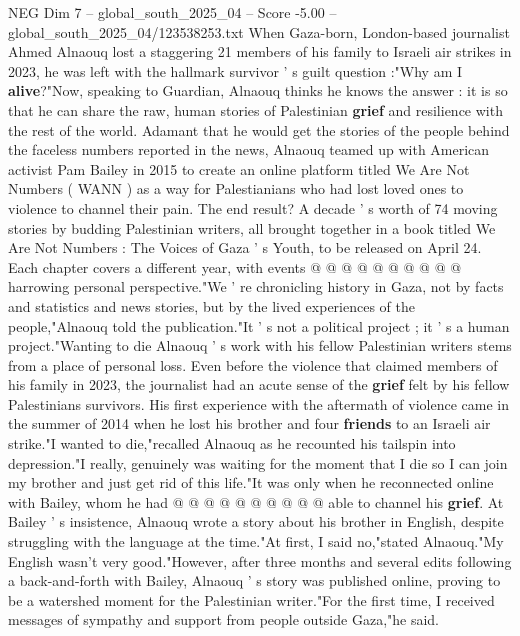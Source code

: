 \begin{textsample}{NEG Dim 7 – global\_south\_2025\_04 – Score -5.00 – global\_south\_2025\_04/123538253.txt}  \label{ex:f7_neg_309}
When Gaza-born, London-based journalist Ahmed Alnaouq lost a staggering 21 members of his family to Israeli air strikes in 2023, he was left with the hallmark survivor ' s guilt question :"Why am I \textbf{alive}?"Now, speaking to Guardian, Alnaouq thinks he knows the answer : it is so that he can share the raw, human stories of Palestinian \textbf{grief} and resilience with the rest of the world.
Adamant that he would get the stories of the people behind the faceless numbers reported in the news, Alnaouq teamed up with American activist Pam Bailey in 2015 to create an online platform titled We Are Not Numbers ( WANN ) as a way for Palestianians who had lost loved ones to violence to channel their pain.
The end result?
A decade ' s worth of 74 moving stories by budding Palestinian writers, all brought together in a book titled We Are Not Numbers : The Voices of Gaza ' s Youth, to be released on April 24.
Each chapter covers a different year, with events @ @ @ @ @ @ @ @ @ @ harrowing personal perspective."We ' re chronicling history in Gaza, not by facts and statistics and news stories, but by the lived experiences of the people,"Alnaouq told the publication."It ' s not a political project ; it ' s a human project."Wanting to die Alnaouq ' s work with his fellow Palestinian writers stems from a place of personal loss.
Even before the violence that claimed members of his family in 2023, the journalist had an acute sense of the \textbf{grief} felt by his fellow Palestinians survivors.
His first experience with the aftermath of violence came in the summer of 2014 when he lost his brother and four \textbf{friends} to an Israeli air strike."I wanted to die,"recalled Alnaouq as he recounted his tailspin into depression."I really, genuinely was waiting for the moment that I die so I can join my brother and just get rid of this life."It was only when he reconnected online with Bailey, whom he had @ @ @ @ @ @ @ @ @ @ able to channel his \textbf{grief}.
At Bailey ' s insistence, Alnaouq wrote a story about his brother in English, despite struggling with the language at the time."At first, I said no,"stated Alnaouq."My English wasn't very good."However, after three months and several edits following a back-and-forth with Bailey, Alnaouq ' s story was published online, proving to be a watershed moment for the Palestinian writer."For the first time, I received messages of sympathy and support from people outside Gaza,"he said.

\end{textsample}
